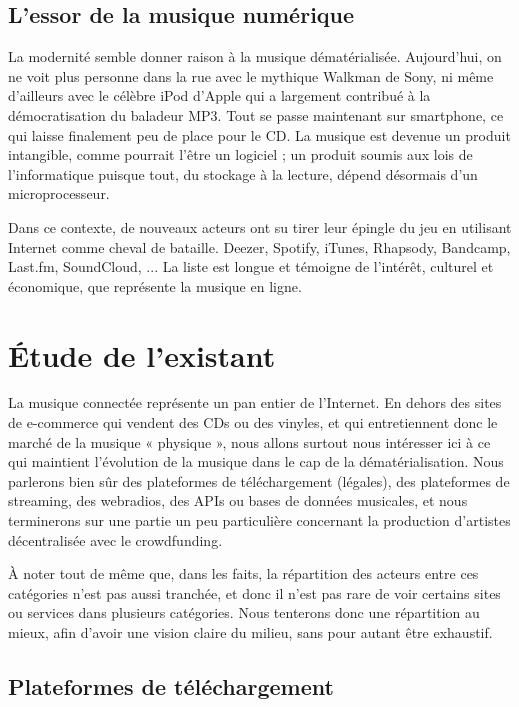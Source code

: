 \documentclass[a4paper,12pt]{article}
\begin{document}
\subsection{L'essor de la musique numérique}

La modernité semble donner raison à la musique dématérialisée. Aujourd'hui, on ne voit plus personne dans la rue avec le mythique Walkman de Sony, ni même d'ailleurs avec le célèbre iPod d'Apple qui a largement contribué à la démocratisation du baladeur MP3. Tout se passe maintenant sur smartphone, ce qui laisse finalement peu de place pour le CD. La musique est devenue un produit intangible, comme pourrait l'être un logiciel ; un produit soumis aux lois de l'informatique puisque tout, du stockage à la lecture, dépend désormais d'un microprocesseur.

Dans ce contexte, de nouveaux acteurs ont su tirer leur épingle du jeu en utilisant Internet comme cheval de bataille. Deezer, Spotify, iTunes, Rhapsody, Bandcamp, Last.fm, SoundCloud, ... La liste est longue et témoigne de l'intérêt, culturel et économique, que représente la musique en ligne.

\section{Étude de l'existant}

La musique connectée représente un pan entier de l'Internet. En dehors des sites de e-commerce qui vendent des CDs ou des vinyles, et qui entretiennent donc le marché de la musique « physique », nous allons surtout nous intéresser ici à ce qui maintient l'évolution de la musique dans le cap de la dématérialisation. Nous parlerons bien sûr des plateformes de téléchargement (légales), des plateformes de streaming, des webradios, des APIs ou bases de données musicales, et nous terminerons sur une partie un peu particulière concernant la production d'artistes décentralisée avec le crowdfunding.

À noter tout de même que, dans les faits, la répartition des acteurs entre ces catégories n'est pas aussi tranchée, et donc il n'est pas rare de voir certains sites ou services dans plusieurs catégories. Nous tenterons donc une répartition au mieux, afin d'avoir une vision claire du milieu, sans pour autant être exhaustif.

\subsection{Plateformes de téléchargement}
\end{document}
